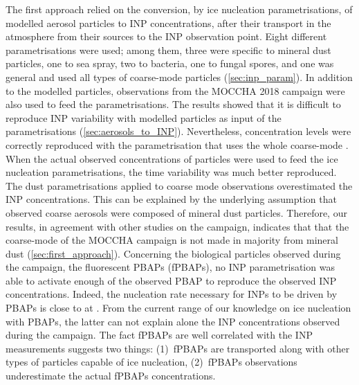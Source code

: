 The first approach relied on the conversion, by ice nucleation parametrisations, of modelled aerosol particles to INP concentrations, after their transport in the atmosphere from their sources to the INP observation point.
Eight different parametrisations were used; among them, three were specific to mineral dust particles, one to sea spray, two to bacteria, one to fungal spores, and one was general and used all types of coarse-mode particles (\cref{sec:inp_param}).
In addition to the modelled particles, observations from the MOCCHA 2018 campaign were also used to feed the parametrisations.
The results showed that it is difficult to reproduce INP variability with modelled particles as input of the parametrisations (\cref{sec:aerosols_to_INP}). Nevertheless, concentration levels were correctly reproduced with the parametrisation that uses the whole coarse-mode \citep{demott_predicting_2010}. %
When the actual observed concentrations of particles were used to feed the ice nucleation parametrisations, the time variability was much better reproduced.
The dust parametrisations applied to coarse mode observations overestimated the INP concentrations. This can be explained by the underlying assumption that observed coarse aerosols were composed of  mineral dust particles. Therefore, our results, in agreement with other studies on the campaign, indicates that that the coarse-mode of the MOCCHA campaign is not made in majority from mineral dust (\cref{sec:first_approach}).
Concerning the biological particles observed during the campaign, the fluorescent PBAPs (fPBAPs), no INP parametrisation was able to activate enough of the observed PBAP to reproduce the observed INP concentrations.
Indeed, the nucleation rate necessary for INPs to be driven by PBAPs is close to  at .
From the current range of our knowledge on ice nucleation with PBAPs, the latter can not explain alone the INP concentrations observed during the campaign.
The fact fPBAPs are well correlated with the INP measurements suggests two things: (1)~fPBAPs are transported along with other types of particles capable of ice nucleation, (2)~fPBAPs observations underestimate the actual fPBAPs concentrations.%

